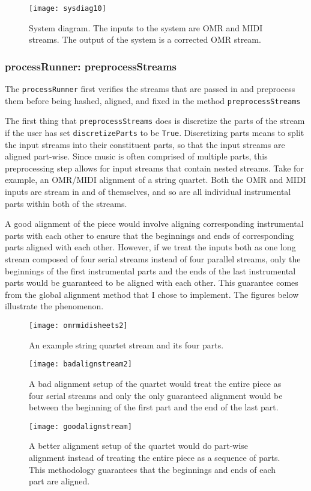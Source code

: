 \begin{figure}[!h]
\centering
\texttt{[image: sysdiag10]}
\caption{System diagram. The inputs to the system are OMR and MIDI streams. The output of the system is a corrected OMR stream.}
\end{figure}

\subsubsection{processRunner: preprocessStreams}\label{processrunner1}
The \texttt{processRunner} first verifies the streams that are passed in and preprocess them before being hashed, aligned, and fixed in the method \texttt{preprocessStreams}

The first thing that \texttt{preprocessStreams} does is discretize the parts of the stream if the user has set \texttt{discretizeParts} to be \texttt{True}. Discretizing parts means to split the input streams into their constituent parts, so that the input streams are aligned part-wise. Since music is often comprised of multiple parts, this preprocessing step allows for input streams that contain nested streams. Take for example, an OMR/MIDI alignment of a string quartet. Both the OMR and MIDI inputs are stream in and of themselves, and so are all individual instrumental parts within both of the streams. 

A good alignment of the piece would involve aligning corresponding instrumental parts with each other to ensure that the beginnings and ends of corresponding parts aligned with each other. However, if we treat the inputs both as one long stream composed of four serial streams instead of four parallel streams, only the beginnings of the first instrumental parts and the ends of the last instrumental parts would be guaranteed to be aligned with each other. This guarantee comes from the global alignment method that I chose to implement. The figures below illustrate the phenomenon. 

\begin{figure}[!h]
\centering
\texttt{[image: omrmidisheets2]}
\caption{An example string quartet stream and its four parts.}
\vspace{10mm}
\texttt{[image: badalignstream2]}
\caption{A bad alignment setup of the quartet would treat the entire piece as four serial streams and only the only guaranteed alignment would be between the beginning of the first part and the end of the last part.}
\vspace{10mm}
\texttt{[image: goodalignstream]}
\caption{A better alignment setup of the quartet would do part-wise alignment instead of treating the entire piece as a sequence of parts. This methodology guarantees that the beginnings and ends of each part are aligned.}
\end{figure}

